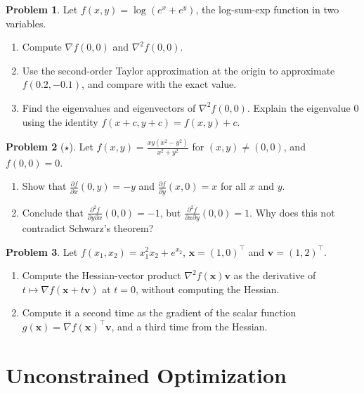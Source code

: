 \documentclass[11pt]{article}
\theoremstyle{definition}
\newtheorem{problem}{Problem}[section]
\begin{document}
\begin{problem}\label{pr:lse-taylor}
    Let $f(x, y) = \log(e^x + e^y)$, the log-sum-exp function in two variables.
    \begin{enumerate}[label=(\alph*)]
        \item Compute $\nabla f(0, 0)$ and $\nabla^2 f(0, 0)$.
        \item Use the second-order Taylor approximation at the origin to approximate $f(0.2, -0.1)$, and compare with the exact value.
        \item Find the eigenvalues and eigenvectors of $\nabla^2 f(0, 0)$. Explain the eigenvalue $0$ using the identity $f(x + c, y + c) = f(x, y) + c$.
    \end{enumerate}
\end{problem}

\begin{problem}[$\star$]\label{pr:schwarz-counterexample}
    Let $f(x, y) = \frac{xy(x^2 - y^2)}{x^2 + y^2}$ for $(x, y) \neq (0, 0)$, and $f(0, 0) = 0$.
    \begin{enumerate}[label=(\alph*)]
        \item Show that $\frac{\partial f}{\partial x}(0, y) = -y$ and $\frac{\partial f}{\partial y}(x, 0) = x$ for all $x$ and $y$.
        \item Conclude that $\frac{\partial^2 f}{\partial y \partial x}(0, 0) = -1$, but $\frac{\partial^2 f}{\partial x \partial y}(0, 0) = 1$. Why does this not contradict Schwarz's theorem?
    \end{enumerate}
\end{problem}

\begin{problem}\label{pr:hvp}
    Let $f(x_1, x_2) = x_1^2x_2 + e^{x_2}$, $\mathbf{x} = (1, 0)^\top$ and $\mathbf{v} = (1, 2)^\top$.
    \begin{enumerate}[label=(\alph*)]
        \item Compute the Hessian-vector product $\nabla^2 f(\mathbf{x})\mathbf{v}$ as the derivative of $t \mapsto \nabla f(\mathbf{x} + t\mathbf{v})$ at $t = 0$, without computing the Hessian.
        \item Compute it a second time as the gradient of the scalar function $g(\mathbf{x}) = \nabla f(\mathbf{x})^\top\mathbf{v}$, and a third time from the Hessian.
    \end{enumerate}
\end{problem}

\section{Unconstrained Optimization}
\end{document}
